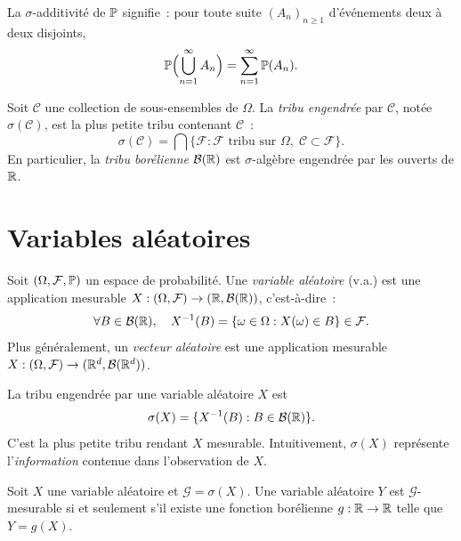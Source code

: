 \begin{remarque}
La $\sigma$-additivit\'e de $\mathbb{P}$ signifie~: pour toute suite $(A_n)_{n \geq 1}$
d'\'ev\'enements deux \`a deux disjoints,
\[
  \mathbb{P}\Bigl(\bigcup_{n=1}^{\infty} A_n\Bigr) = \sum_{n=1}^{\infty} \mathbb{P}(A_n).
\]
\end{remarque}

\begin{definition}
Soit $\mathcal{C}$ une collection de sous-ensembles de $\Omega$. La \emph{tribu
engendr\'ee} par $\mathcal{C}$, not\'ee $\sigma(\mathcal{C})$, est la plus petite
tribu contenant $\mathcal{C}$~:
\[
  \sigma(\mathcal{C}) = \bigcap \bigl\{ \mathcal{F} : \mathcal{F} \text{ tribu sur }
  \Omega,\; \mathcal{C} \subset \mathcal{F} \bigr\}.
\]
En particulier, la \emph{tribu bor\'elienne} $\mathcal{B}(\mathbb{R})$ est $\sigma$-alg\`ebre
engendr\'ee par les ouverts de $\mathbb{R}$.
\end{definition}

\section{Variables al\'eatoires}

\begin{definition}
Soit $(\Omega, \mathcal{F}, \mathbb{P})$ un espace de probabilit\'e. Une \emph{variable
al\'eatoire} (v.a.) est une application mesurable $X : (\Omega, \mathcal{F}) \to
(\mathbb{R}, \mathcal{B}(\mathbb{R}))$, c'est-\`a-dire~:
\[
  \forall B \in \mathcal{B}(\mathbb{R}), \quad X^{-1}(B) = \{\omega \in \Omega : X(\omega) \in B\} \in \mathcal{F}.
\]
Plus g\'en\'eralement, un \emph{vecteur al\'eatoire} est une application mesurable
$X : (\Omega, \mathcal{F}) \to (\mathbb{R}^d, \mathcal{B}(\mathbb{R}^d))$.
\end{definition}

\begin{definition}
La tribu engendr\'ee par une variable al\'eatoire $X$ est
\[
  \sigma(X) = \{X^{-1}(B) : B \in \mathcal{B}(\mathbb{R})\}.
\]
C'est la plus petite tribu rendant $X$ mesurable. Intuitivement, $\sigma(X)$
repr\'esente l'\emph{information} contenue dans l'observation de $X$.
\end{definition}

\begin{theoreme}
\label{thm:doob_lemme}
Soit $X$ une variable al\'eatoire et $\mathcal{G} = \sigma(X)$. Une variable
al\'eatoire $Y$ est $\mathcal{G}$-mesurable si et seulement s'il existe une
fonction bor\'elienne $g : \mathbb{R} \to \mathbb{R}$ telle que $Y = g(X)$.
\end{theoreme}

